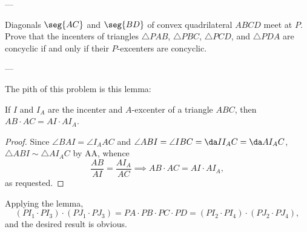 
---

Diagonals $\seg{AC}$ and $\seg{BD}$ of convex quadrilateral $ABCD$ meet at $P$. Prove that the incenters of triangles $\triangle PAB$, $\triangle PBC$, $\triangle PCD$, and $\triangle PDA$ are concyclic if and only if their $P$-excenters are concyclic.

---

The pith of this problem is this lemma:
\begin{boxlemma*}
    If $I$ and $I_A$ are the incenter and $A$-excenter of a triangle $ABC$, then $AB\cdot AC=AI\cdot AI_A$.
\end{boxlemma*}
\begin{proof}
    Since $\angle BAI=\angle I_AAC$ and $\angle ABI=\angle IBC=\da II_AC=\da AI_AC$, $\triangle ABI\sim\triangle AI_AC$ by AA, whence \[\frac{AB}{AI}=\frac{AI_A}{AC}\implies AB\cdot AC=AI\cdot AI_A,\]
    as requested.
\end{proof}

Applying the lemma, \[(PI_1\cdot PI_3)\cdot(PJ_1\cdot PJ_3)=PA\cdot PB\cdot PC\cdot PD=(PI_2\cdot PI_4)\cdot(PJ_2\cdot PJ_4),\]
and the desired result is obvious.
